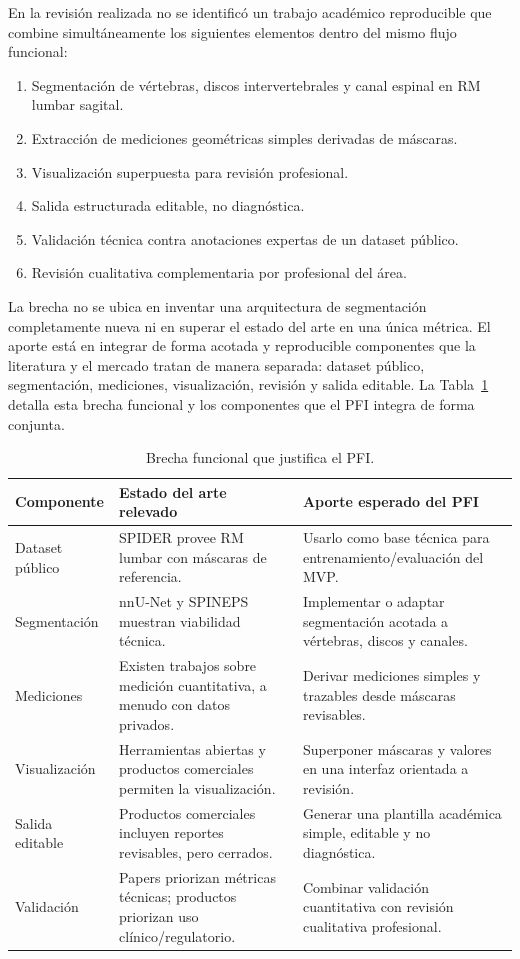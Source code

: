 En la revisión realizada no se identificó un trabajo académico reproducible que combine simultáneamente los siguientes elementos dentro del mismo flujo funcional:

\begin{enumerate}
    \item Segmentación de vértebras, discos intervertebrales y canal espinal en RM lumbar sagital.
    \item Extracción de mediciones geométricas simples derivadas de máscaras.
    \item Visualización superpuesta para revisión profesional.
    \item Salida estructurada editable, no diagnóstica.
    \item Validación técnica contra anotaciones expertas de un dataset público.
    \item Revisión cualitativa complementaria por profesional del área.
\end{enumerate}

La brecha no se ubica en inventar una arquitectura de segmentación completamente nueva ni en superar el estado del arte en una única métrica. El aporte está en integrar de forma acotada y reproducible componentes que la literatura y el mercado tratan de manera separada: dataset público, segmentación, mediciones, visualización, revisión y salida editable. La Tabla~\ref{tab:brecha_funcional_pfi} detalla esta brecha funcional y los componentes que el PFI integra de forma conjunta.

\begin{table}[htbp]
\centering
\caption{Brecha funcional que justifica el PFI.}
\label{tab:brecha_funcional_pfi}
\small
\begin{tabularx}{\textwidth}{p{} X X}
\hline
\textbf{Componente} & \textbf{Estado del arte relevado} & \textbf{Aporte esperado del PFI} \\
\hline
Dataset público & SPIDER provee RM lumbar con máscaras de referencia. & Usarlo como base técnica para entrenamiento/evaluación del MVP. \\
Segmentación & nnU-Net y SPINEPS muestran viabilidad técnica. & Implementar o adaptar segmentación acotada a vértebras, discos y canales. \\
Mediciones & Existen trabajos sobre medición cuantitativa, a menudo con datos privados. & Derivar mediciones simples y trazables desde máscaras revisables. \\
Visualización & Herramientas abiertas y productos comerciales permiten la visualización. & Superponer máscaras y valores en una interfaz orientada a revisión. \\
Salida editable & Productos comerciales incluyen reportes revisables, pero cerrados. & Generar una plantilla académica simple, editable y no diagnóstica. \\
Validación & Papers priorizan métricas técnicas; productos priorizan uso clínico/regulatorio. & Combinar validación cuantitativa con revisión cualitativa profesional. \\
\hline
\end{tabularx}
\end{table}


